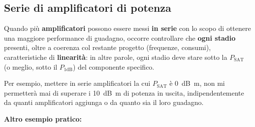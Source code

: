 \documentclass[openany,a4paper,12pt]{book}
\begin{document}
\subsection*{Serie di amplificatori di potenza}

Quando più \textbf{amplificatori} possono essere messi \textbf{in serie} con lo scopo di ottenere una maggiore performance di guadagno, occorre controllare che \textbf{ogni stadio} presenti, oltre a coerenza col restante progetto (frequenze, consumi), caratteristiche di \textbf{linearità}: in altre parole, ogni stadio deve stare sotto la $P_{\text{SAT}}$ (o meglio, sotto il $P_{1\text{dB}}$) del componente specifico.

Per esempio, mettere in serie amplificatori la cui $P_{\text{SAT}}$ è \qty{0}{\deci\bel m}, non mi permetterà mai di superare i \qty{10}{\deci\bel m} di potenza in uscita, indipendentemente da quanti amplificatori aggiunga o da quanto sia il loro guadagno.

\vspace{0.3cm}
\textbf{Altro esempio pratico:}

\begin{figure}[H]
    \centering
\end{figure}
\end{document}
